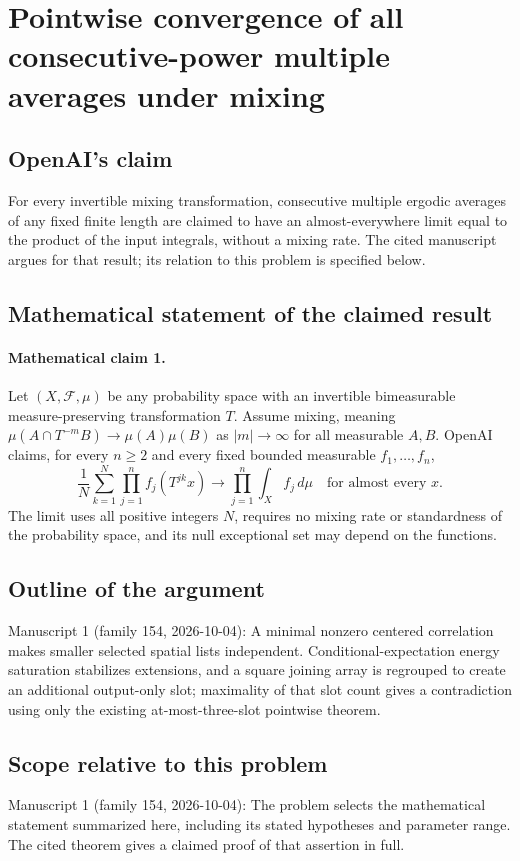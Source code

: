 \documentclass[11pt]{article}
\begin{document}
\section*{Pointwise convergence of all consecutive-power multiple averages under mixing}

\subsection{OpenAI's claim}
For every invertible mixing transformation, consecutive multiple ergodic averages of any fixed finite length are claimed to have an almost-everywhere limit equal to the product of the input integrals, without a mixing rate. The cited manuscript argues for that result; its relation to this problem is specified below.

\subsection{Mathematical statement of the claimed result}
\paragraph{Mathematical claim 1.} Let $(X,\mathcal F,\mu)$ be any probability space with an invertible bimeasurable measure-preserving transformation $T$. Assume mixing, meaning $\mu(A\cap T^{-m}B)\to\mu(A)\mu(B)$ as $|m|\to\infty$ for all measurable $A,B$. OpenAI claims, for every $n\ge2$ and every fixed bounded measurable $f_1,\ldots,f_n$,
\[
\frac1N\sum_{k=1}^N\prod_{j=1}^n f_j(T^{jk}x)\longrightarrow\prod_{j=1}^n\int_X f_j\,d\mu
\quad\text{for almost every }x.
\]
The limit uses all positive integers $N$, requires no mixing rate or standardness of the probability space, and its null exceptional set may depend on the functions.

\subsection{Outline of the argument}
Manuscript 1 (family 154, 2026-10-04): A minimal nonzero centered correlation makes smaller selected spatial lists independent. Conditional-expectation energy saturation stabilizes extensions, and a square joining array is regrouped to create an additional output-only slot; maximality of that slot count gives a contradiction using only the existing at-most-three-slot pointwise theorem.

\subsection{Scope relative to this problem}
Manuscript 1 (family 154, 2026-10-04): The problem selects the mathematical statement summarized here, including its stated hypotheses and parameter range. The cited theorem gives a claimed proof of that assertion in full.
\end{document}

